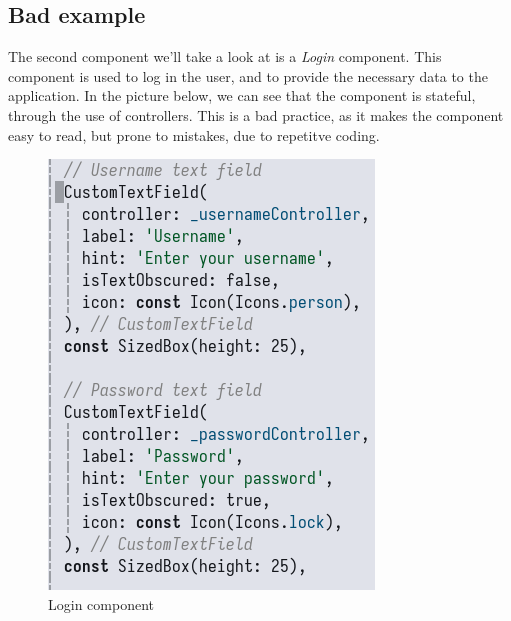 \newpage
\subsection{Bad example}
The second component we'll take a look at is a \textit{Login} component.
This component is used to log in the user, and to provide the necessary data to the application.
In the picture below, we can see that the component is stateful, through the use of controllers.
This is a bad practice, as it makes the component easy to read, but prone to mistakes, due to repetitve coding.

\begin{figure}[htbp]
    \centering
    \includegraphics[scale=0.4]{pictures/looks_bad_but_is_good_because.png}
    \caption{Login component}
    \label{loginComponent}
\end{figure}


